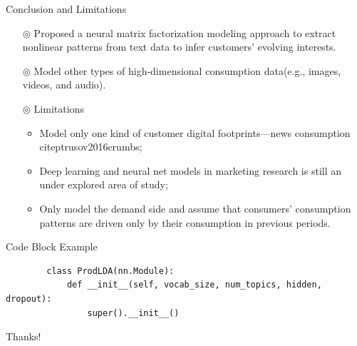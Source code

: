 \documentclass{beamer}
\begin{document}
\begin{frame}{Conclusion and Limitations}
	\begin{itemize}
		\item[$\circledcirc$] Proposed a neural matrix factorization modeling approach to extract nonlinear patterns from text data to infer customers' evolving interests.
		\item[$\circledcirc$] Model other types of high-dimensional consumption data(e.g., images, videos, and audio).
		\item[$\circledcirc$] Limitations
		      \begin{itemize}
			      \item Model only one kind of customer digital footprints—news consumption\\citep{trusov2016crumbs};
			      \item Deep learning and neural net models in marketing research is still an under explored area of study;
			      \item Only model the demand side and assume that consumers' consumption patterns are driven only by their consumption in previous periods.
		      \end{itemize}
	\end{itemize}
\end{frame}

\begin{frame}[fragile]{Code Block Example}
    \begin{verbatim}
        class ProdLDA(nn.Module):
            def __init__(self, vocab_size, num_topics, hidden, dropout):
                super().__init__()
    \end{verbatim}
\end{frame}

\begin{frame}
	\begin{center}
		{\Huge\calligra Thanks!}
	\end{center}
\end{frame}


% 	
% 	

%    
%    
\end{document}
